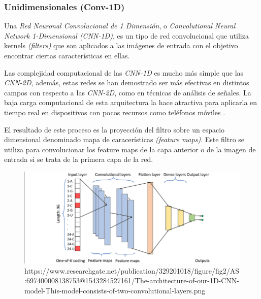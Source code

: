             \subsubsection{Unidimensionales (Conv-1D)}
            
                Una \textit{Red Neuronal Convolucional de 1 Dimensión}, o \textit{Convolutional Neural Network 1-Dimensional (CNN-1D)}, es un tipo de red convolucional que utiliza kernels \textit{(filters)} que son aplicados a las imágenes de entrada con el objetivo encontrar ciertas características en ellas.

                Las complejidad computacional de las \textit{CNN-1D} es mucho más simple que las \textit{CNN-2D}, además, estas redes se han demostrado ser más efectivas en distintos campos con respecto a las \textit{CNN-2D}, como en técnicas de análisis de señales. La baja carga computacional de esta arquitectura la hace atractiva para aplicarla en tiempo real en dispositivos con pocos recursos como teléfonos móviles \cite{Conv1D_Survey}.


                El resultado de este proceso es la proyección del filtro sobre un espacio dimensional denominado mapa de caracerísticas \textit{(feature maps)}. Este filtro se utiliza para convolucionar los feature maps de la capa anterior \cite{FiltersFeatureMaps} o de la imagen de entrada si se trata de la primera capa de la red.
                

                \begin{figure}[h]
                    \centering
                    \includegraphics[width=15cm]{archivos/CNN/1D/1CNNArchImage}
                    \caption{https://www.researchgate.net/publication/329201018/figure/fig2/AS:697400008138753@1543284527161/The-architecture-of-our-1D-CNN-model-This-model-consists-of-two-convolutional-layers.png}
                    \label{1CNNArchImage}
                \end{figure}


